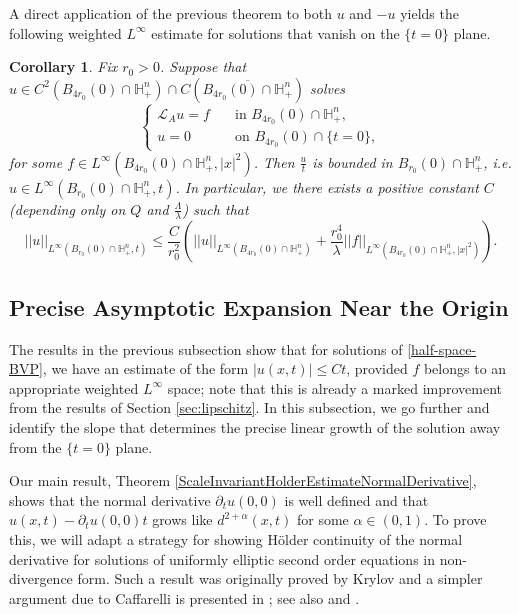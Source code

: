 \documentclass[12pt]{amsart}
\newtheorem{Corollary}[Theorem]{Corollary}
\def \H {{\mathbb H}}
\def \L {\mathcal{L}}
\def \a {\alpha}
\begin{document}
A direct application of the previous theorem to both $u$ and $-u$ yields the following weighted $L^{\infty}$ estimate for solutions that vanish on the $\{t=0\}$ plane.

\begin{Corollary}\label{nocond}
Fix $r_0>0$. Suppose that $u\in C^2(B_{4r_0}(0)\cap\H^n_+)\cap C(\overline{B_{4r_0}(0)\cap\H^n_+})$ solves
$$\begin{cases}
\L_A u = f & \quad \text{in } B_{4r_0}(0)\cap\H^n_+, \\
u= 0 & \quad \text{on }  B_{4r_0}(0) \cap \{t=0\},
\end{cases}$$
for some $f \in L^{\infty}(B_{4r_0}(0)\cap\H^n_+,|x|^2)$. Then $\frac{u}{t}$ is bounded in $B_{r_0}(0)\cap \H^n_+$, i.e. $u\in L^\infty(B_{r_0}(0)\cap \H^n_+, t)$. In particular, we there exists a positive constant $C$ (depending only on $Q$ and $\frac{\Lambda}{\lambda}$) such that
$$
||u||_{L^{\infty}(B_{r_0}(0)\cap\H^n_+,t)} \leq \frac{C}{r_0^2} \left( ||u||_{L^{\infty}(B_{4r_0}(0)\cap\H^n_+)} + \frac{r_0^4}{\lambda}  ||f||_{L^{\infty}(B_{4r_0}(0)\cap\H^n_+,|x|^2)} \right).
$$
\end{Corollary}

\subsection{Precise Asymptotic Expansion Near the Origin}\label{LiptoC1alpha}

The results in the previous subsection show that for solutions of \eqref{half-space-BVP}, we have an estimate of the form $|u(x,t)| \leq Ct$, provided $f$ belongs to an appropriate weighted $L^{\infty}$ space; note that this is already a marked improvement from the results of Section \ref{sec:lipschitz}. In this subsection, we go further and identify the slope that determines the precise linear growth of the solution away from the $\{t = 0\}$ plane.

Our main result, Theorem \ref{ScaleInvariantHolderEstimateNormalDerivative}, shows that the normal derivative $\partial_t u(0,0)$ is well defined and that $u(x,t) - \partial_t u(0,0) t$ grows like $d^{2+\a}(x,t)$ for some $\a \in(0,1)$. To prove this, we will adapt a strategy for showing H\"older continuity of the normal derivative for solutions of uniformly elliptic second order equations in non-divergence form. Such a result was originally proved by Krylov \cite{Krylov83} and a simpler argument due to Caffarelli is presented in \cite[Chapter IV, Section 3]{KazdanBook}; see also \cite[Theorem 9.31]{GTBook} and \cite[Chapter 1, Section 1.2.3]{HanBook}.
\end{document}
